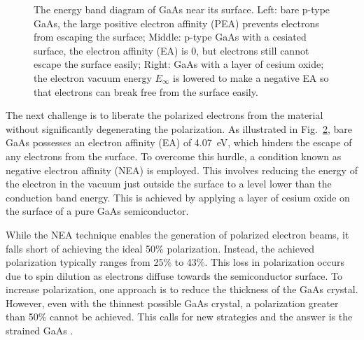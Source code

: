 \begin{figure}[!h]
\begin{subfigure}[b]{0.32\textwidth}
{
	}
	\label{fig:NEA}
    \end{subfigure}
    \caption[Energy band diagram of GaAs]
    {The energy band diagram of GaAs near its surface. 
    Left: bare p-type GaAs, the large positive electron affinity (PEA) 
    prevents electrons from escaping the surface; 
    Middle: p-type GaAs with a cesiated surface, the electron affinity (EA)
    is 0, but electrons still cannot escape the surface easily; 
    Right: GaAs with a layer of cesium oxide; the electron vacuum energy $E_\infty$ is
    lowered to make a negative EA so that electrons can break free from the surface
    easily. \cite{CARDMAN1992317}}
    \label{fig:electron_affinity}
\end{figure}
The next challenge is to liberate the polarized electrons from the material without 
significantly degenerating the polarization. As illustrated in Fig.~\ref{fig:electron_affinity},
bare GaAs possesses an electron affinity (EA) of 4.07~eV, which hinders the escape 
of any electrons from the surface. To overcome this hurdle, a condition known as negative
electron affinity (NEA) is employed. This involves reducing the energy of the electron in 
the vacuum just outside the surface to a level lower than the conduction band energy. 
This is achieved by applying a layer of cesium oxide on the surface of a pure GaAs semiconductor.

While the NEA technique enables the generation of polarized electron beams, it falls short of achieving the ideal 50\% polarization. Instead, the achieved polarization typically ranges from 25\% to 43\%. This loss in polarization occurs due to spin dilution as electrons diffuse towards the semiconductor surface. To increase polarization, one approach is to reduce the thickness of the GaAs crystal. However, even with the thinnest possible GaAs crystal, a polarization greater than 50\% cannot be achieved. This calls for new strategies and the answer is the strained GaAs \cite{CARDMAN1992317}.

